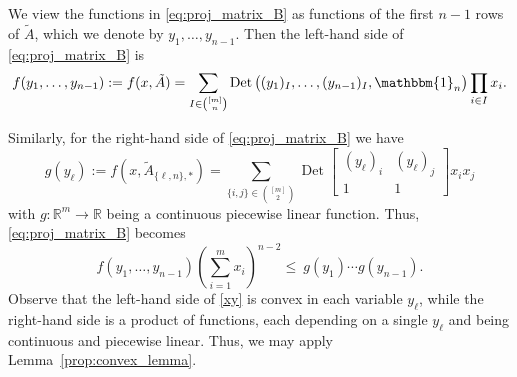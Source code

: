\documentclass[11pt]{amsart}
\newcommand{\R}{\mathbb R}
\theoremstyle{definition}
\theoremstyle{remark}
\newcommand{\Det}{\operatorname{Det}}
\newcommand{\onevec}{\mathbbm{1}}
\begin{document}
We view the functions in \eqref{eq:proj_matrix_B} %
as functions of the first $n-1$ rows of $\tilde A$, which we denote by $y_1,\dots, y_{n-1}$. 
Then the left-hand side of \eqref{eq:proj_matrix_B} is
\begin{equation}\label{e:n-by-n}
f(y_1,\ldots,y_{n-1}) := f(x,\tilde A)
= \sum_{I \in \binom{[m]}{n}} \Det\big((y_1)_I,\ldots,(y_{n-1})_I,\onevec_n\big)\prod_{i \in I} x_i.
\end{equation}

Similarly, for the right-hand side of \eqref{eq:proj_matrix_B} we have
\begin{equation}\label{e:2by2}
g(y_{\ell}):=f(x,\tilde A_{\{\ell,n\},\ast})=
\sum_{\{i,j\} \in \binom{[m]}{2}}
\Det \begin{bmatrix}
(y_{\ell})_i & (y_{\ell})_j \\
1 & 1
\end{bmatrix}x_i x_j
\end{equation}
%
with $g : \R^m \to \R$ being a continuous piecewise linear function. 
Thus, \eqref{eq:proj_matrix_B} becomes
\begin{equation}\label{xy}
f(y_1,\ldots,y_{n-1}) \left( \sum_{i=1}^m x_i \right)^{n-2} \le\ g(y_1)\cdots g(y_{n-1}).
\end{equation}
Observe that the left-hand side of \eqref{xy} is convex in each variable $y_\ell$, while the right-hand side is a product of functions, each depending on a single $y_\ell$ and being continuous and piecewise linear. Thus, we may apply Lemma~\eqref{prop:convex_lemma}. 
\end{document}
